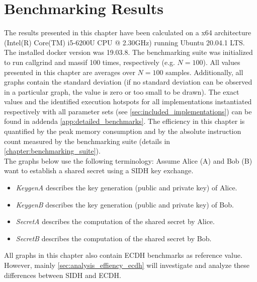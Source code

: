 \chapter{Benchmarking Results}\label{chapter:analysis}

The results presented in this chapter have been calculated on a x64 architecture (Intel(R) Core(TM) i5-6200U CPU @ 2.30GHz) running Ubuntu 20.04.1 LTS. The installed docker version was 19.03.8. The benchmarking suite was initialized to run callgrind and massif 100 times, respectively (e.g. $N=100$). All values presented in this chapter are averages over $N=100$ samples. Additionally, all graphs contain the standard deviation (if no standard deviation can be observed in a particular graph, the value is zero or too small to be drawn). The exact values and the identified execution hotspots for all implementations instantiated respectively with all parameter sets (see \autoref{sec:included_implementations}) can be found in addenda \ref{app:detailed_benchmarks}. The efficiency in this chapter is quantified by the peak memory consumption and by the absolute instruction count measured by the benchmarking suite (details in \autoref{chapter:benchmarking_suite}). \\
The graphs below use the following terminology:
Assume Alice (A) and Bob (B) want to establish a shared secret using a \gls{SIDH} key exchange.
\begin{itemize}
\item \textit{KeygenA} describes the key generation (public and private key) of Alice.
\item \textit{KeygenB} describes the key generation (public and private key) of Bob.
\item \textit{SecretA} describes the computation of the shared secret by Alice.
\item \textit{SecretB} describes the computation of the shared secret by Bob.
\end{itemize}
All graphs in this chapter also contain \gls{ECDH} benchmarks as reference value. However, mainly \autoref{sec:analysis_effiency_ecdh} will investigate and analyze these differences between \gls{SIDH} and \gls{ECDH}.\\

